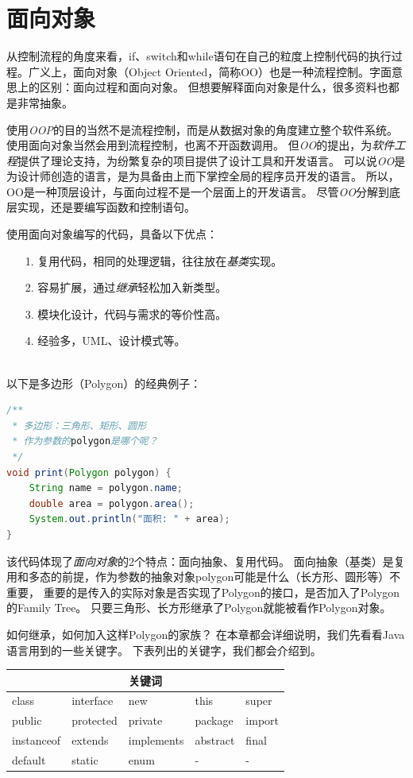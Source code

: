 \chapter{面向对象}
\label{chap:java_oo}

从控制流程的角度来看，if、switch和while语句在自己的粒度上控制代码的执行过程。广义上，面向对象（Object Oriented，简称OO）也是一种流程控制。字面意思上的区别：面向过程和面向对象。
但想要解释面向对象是什么，很多资料也都是非常抽象。

使用\emph{OOP}的目的当然不是流程控制，而是从数据对象的角度建立整个软件系统。
使用面向对象当然会用到流程控制，也离不开函数调用。
但\emph{OO}的提出，为\emph{软件工程}提供了理论支持，为纷繁复杂的项目提供了设计工具和开发语言。
可以说\emph{OO}是为设计师创造的语言，是为具备由上而下掌控全局的程序员开发的语言。
所以，OO是一种顶层设计，与面向过程不是一个层面上的开发语言。
尽管\emph{OO}分解到底层实现，还是要编写函数和控制语句。

\vspace{0.4cm} \noindent
使用面向对象编写的代码，具备以下优点：
\begin{itemize}
\item[1.] 复用代码，相同的处理逻辑，往往放在\emph{基类}实现。
\item[2.] 容易扩展，通过\emph{继承}轻松加入新类型。
\item[3.] 模块化设计，代码与需求的等价性高。
\item[4.] 经验多，UML、设计模式等。
\end{itemize}
\ \\
\noindent
以下是多边形（Polygon）的经典例子：
\begin{lstlisting}[language=Java]
/**
 * 多边形：三角形、矩形、圆形
 * 作为参数的polygon是哪个呢？
 */
void print(Polygon polygon) {
    String name = polygon.name;
    double area = polygon.area();
    System.out.println("面积: " + area);
}
\end{lstlisting}

\noindent
该代码体现了\emph{面向对象}的2个特点：面向抽象、复用代码。
面向抽象（基类）是复用和多态的前提，作为参数的抽象对象polygon可能是什么（长方形、圆形等）不重要，
重要的是传入的实际对象是否实现了Polygon的接口，是否加入了Polygon的Family Tree。
只要三角形、长方形继承了Polygon就能被看作Polygon对象。

如何继承，如何加入这样Polygon的家族？
在本章都会详细说明，我们先看看Java语言用到的一些关键字。
下表列出的关键字，我们都会介绍到。
\begin{table}[!htbp]\centering
\begin{tabular}{|p{2cm}|p{2cm}|p{2cm}|p{2cm}|p{2cm}|}
\hline
\multicolumn{5}{|c|}{关键词}\\
\hline
class&interface&new&this&super\\
public&protected&private&package&import\\
instanceof&extends&implements&abstract&final\\
default&static&enum&-&-\\
\hline
\end{tabular}
\label{table:part1_oo_keywords}
\end{table}


